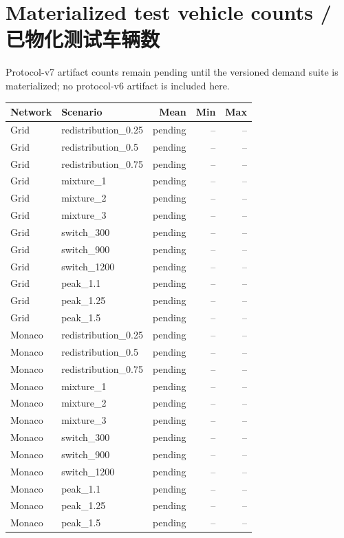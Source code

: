 \section*{Materialized test vehicle counts / 已物化测试车辆数}
Protocol-v7 artifact counts remain pending until the versioned demand suite is materialized; no protocol-v6 artifact is included here.
\begin{longtable}{@{}llrrr@{}}
\toprule
Network & Scenario & Mean & Min & Max \\
\midrule
Grid & redistribution\_0.25 & pending & -- & -- \\
Grid & redistribution\_0.5 & pending & -- & -- \\
Grid & redistribution\_0.75 & pending & -- & -- \\
Grid & mixture\_1 & pending & -- & -- \\
Grid & mixture\_2 & pending & -- & -- \\
Grid & mixture\_3 & pending & -- & -- \\
Grid & switch\_300 & pending & -- & -- \\
Grid & switch\_900 & pending & -- & -- \\
Grid & switch\_1200 & pending & -- & -- \\
Grid & peak\_1.1 & pending & -- & -- \\
Grid & peak\_1.25 & pending & -- & -- \\
Grid & peak\_1.5 & pending & -- & -- \\
Monaco & redistribution\_0.25 & pending & -- & -- \\
Monaco & redistribution\_0.5 & pending & -- & -- \\
Monaco & redistribution\_0.75 & pending & -- & -- \\
Monaco & mixture\_1 & pending & -- & -- \\
Monaco & mixture\_2 & pending & -- & -- \\
Monaco & mixture\_3 & pending & -- & -- \\
Monaco & switch\_300 & pending & -- & -- \\
Monaco & switch\_900 & pending & -- & -- \\
Monaco & switch\_1200 & pending & -- & -- \\
Monaco & peak\_1.1 & pending & -- & -- \\
Monaco & peak\_1.25 & pending & -- & -- \\
Monaco & peak\_1.5 & pending & -- & -- \\
\bottomrule
\end{longtable}
